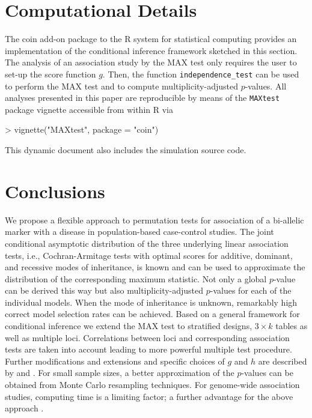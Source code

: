 \documentclass[bimj,fleqn]{w-art}
\newcommand{\Rpackage}[1]{{\normalfont\fontseries{b}\selectfont #1}}
\begin{document}
\section{Computational Details \label{Comp}}

The \Rpackage{coin} add-on package \citep{Hothorn:2006:AmStat, Hothorn+Hornik+VanDeWiel:2008, PKG:coin}
to the \textsf{R} system for statistical computing \citep{rcore2007}
provides an implementation of the conditional inference framework
sketched in this section. The analysis of an association study 
by the MAX test only requires the user to set-up the score function $g$. Then, the
function \texttt{independence\_test} can be used to perform 
the MAX test and to compute multiplicity-adjusted $p$-values.
All analyses presented in this paper
are reproducible by means of the \texttt{MAXtest} package vignette
accessible from within \textsf{R} via
\begin{Schunk}
\begin{Sinput}
> vignette("MAXtest", package = "coin")
\end{Sinput}
\end{Schunk}
This dynamic document also includes the simulation source code.

\section{Conclusions}

We propose a flexible approach to permutation tests for association of a    
bi-allelic marker with a disease in population-based case-control 
studies. The joint conditional asymptotic distribution of the 
three underlying 
linear association tests, i.e., Cochran-Armitage tests with optimal
scores for additive, dominant, and recessive modes of inheritance,
is known and can be used to approximate the distribution of the 
corresponding maximum statistic.
Not only a global $p$-value can be derived this way but also
multiplicity-adjusted $p$-values for each of the individual models. 
When the mode of inheritance is unknown, remarkably high correct model 
selection rates can be achieved. Based on a general framework for conditional 
inference we extend the MAX test to stratified designs, $3 \times k$ tables 
as well as multiple loci. Correlations between 
loci and corresponding association tests are taken into account leading to 
more powerful multiple test procedure. Further modifications and extensions
and specific choices of $g$ and $h$ are described by \cite{Hothorn:2006:AmStat} 
and \cite{Hothorn+Hornik+VanDeWiel:2008}.
For small sample sizes, a better approximation of the $p$-values 
can be obtained from Monte Carlo resampling techniques.
For genome-wide association studies, computing time is a limiting factor; 
a further advantage for the above approach \citep{Ziegler2008}.
\end{document}
